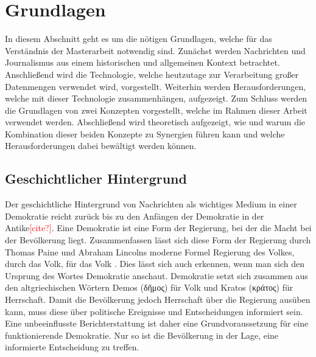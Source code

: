 \section{Grundlagen}
In diesem Abschnitt geht es um die nötigen Grundlagen, welche für das Verständnis der Masterarbeit notwendig sind.
Zunächst werden Nachrichten und Journalismus aus einem historischen und allgemeinen Kontext betrachtet.
Anschließend wird die Technologie, welche heutzutage zur Verarbeitung großer Datenmengen verwendet wird, vorgestellt.
Weiterhin werden Herausforderungen, welche mit dieser Technologie zusammenhängen, aufgezeigt.
Zum Schluss werden die Grundlagen von zwei Konzepten vorgestellt, welche im Rahmen dieser Arbeit verwendet werden.
Abschließend wird theoretisch aufgezeigt, wie und warum die Kombination dieser beiden Konzepte zu Synergien führen kann und welche Herausforderungen dabei bewältigt werden können.

\subsection{Geschichtlicher Hintergrund}\label{sec:story-background}
Der geschichtliche Hintergrund von Nachrichten als wichtiges Medium in einer Demokratie reicht zurück bis zu den Anfängen der Demokratie in der Antike\textcolor{red}{[cite?]}.
Eine Demokratie ist eine Form der Regierung, bei der die Macht bei der Bevölkerung liegt.
Zusammenfassen lässt sich diese Form der Regierung durch Thomas Paine und Abraham Lincolns moderne Formel \glqq Regierung des Volkes, durch das Volk, für das Volk\grqq{} \cite{lincoln}.
Dies lässt sich auch erkennen, wenn man sich den Ursprung des Wortes Demokratie anschaut.
Demokratie setzt sich zusammen aus den altgriechischen Wörtern Demos (\textgreek{δῆμος}) für Volk und Kratos (\textgreek{κράτος}) für Herrschaft.
Damit die Bevölkerung jedoch Herrschaft über die Regierung ausüben kann, muss diese über politische Ereignisse und Entscheidungen informiert sein.
Eine unbeeinflusste Berichterstattung ist daher eine Grundvoraussetzung für eine funktionierende Demokratie.
Nur so ist die Bevölkerung in der Lage, eine informierte Entscheidung zu treffen. \\


